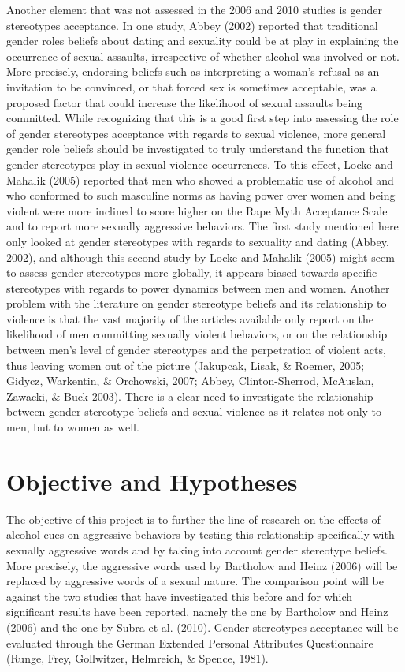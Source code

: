 \documentclass[authordate, serif, review]{jote-article}
\begin{document}
\begin{multicols}{2}
Another element that was not assessed in the 2006 and 2010 studies is gender stereotypes acceptance. In one study, Abbey (2002) reported that traditional gender roles beliefs about dating and sexuality could be at play in explaining the occurrence of sexual assaults, irrespective of whether alcohol was involved or not. More precisely, endorsing beliefs such as interpreting a woman's refusal as an invitation to be convinced, or that forced sex is sometimes acceptable, was a proposed factor that could increase the likelihood of sexual assaults being committed. While recognizing that this is a good first step into assessing the role of gender stereotypes acceptance with regards to sexual violence, more general gender role beliefs should be investigated to truly understand the function that gender stereotypes play in sexual violence occurrences. To this effect, Locke and Mahalik (2005) reported that men who showed a problematic use of alcohol and who conformed to such masculine norms as having power over women and being violent were more inclined to score higher on the Rape Myth Acceptance Scale and to report more sexually aggressive behaviors. The first study mentioned here only looked at gender stereotypes with regards to sexuality and dating (Abbey, 2002), and although this second study by Locke and Mahalik (2005) might seem to assess gender stereotypes more globally, it appears biased towards specific stereotypes with regards to power dynamics between men and women. Another problem with the literature on gender stereotype beliefs and its relationship to violence is that the vast majority of the articles available only report on the likelihood of men committing sexually violent behaviors, or on the relationship between men's level of gender stereotypes and the perpetration of violent acts, thus leaving women out of the picture (Jakupcak, Lisak, \& Roemer, 2005; Gidycz, Warkentin, \& Orchowski, 2007; Abbey, Clinton-Sherrod, McAuslan, Zawacki, \& Buck 2003). There is a clear need to investigate the relationship between gender stereotype beliefs and sexual violence as it relates not only to men, but to women as well. 

{}
\section*{Objective and Hypotheses}

The objective of this project is to further the line of research on the effects of alcohol cues on aggressive behaviors by testing this relationship specifically with sexually aggressive words and by taking into account gender stereotype beliefs. More precisely, the aggressive words used by Bartholow and Heinz (2006) will be replaced by aggressive words of a sexual nature. The comparison point will be against the two studies that have investigated this before and for which significant results have been reported, namely the one by Bartholow and Heinz (2006) and the one by Subra et al. (2010). Gender stereotypes acceptance will be evaluated through the German Extended Personal Attributes Questionnaire (Runge, Frey, Gollwitzer, Helmreich, \& Spence, 1981).


\end{multicols}
\end{document}
